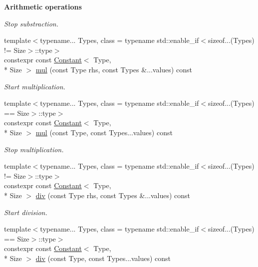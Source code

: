 \begin{Indent}{\bf Arithmetic operations}
\begin{DoxyCompactItemize}
\begin{DoxyCompactList}\small\item\em Stop substraction. \end{DoxyCompactList}\item 
{\footnotesize template$<$typename... Types, class  = typename std\-::enable\-\_\-if$<$sizeof...(\-Types) != Size$>$\-::type$>$ }\\constexpr const \hyperlink{exceptionmagrathea_1_1Constant}{Constant}$<$ Type, \\*
Size $>$ \hyperlink{exceptionmagrathea_1_1Constant_a3a426a14fc3ebb44c36eca6895eadfd5}{mul} (const Type rhs, const Types \&...values) const 
\begin{DoxyCompactList}\small\item\em Start multiplication. \end{DoxyCompactList}\item 
{\footnotesize template$<$typename... Types, class  = typename std\-::enable\-\_\-if$<$sizeof...(\-Types) == Size$>$\-::type$>$ }\\constexpr const \hyperlink{exceptionmagrathea_1_1Constant}{Constant}$<$ Type, \\*
Size $>$ \hyperlink{exceptionmagrathea_1_1Constant_a31a02497bdf0805776395f1be257e0ce}{mul} (const Type, const Types...\-values) const 
\begin{DoxyCompactList}\small\item\em Stop multiplication. \end{DoxyCompactList}\item 
{\footnotesize template$<$typename... Types, class  = typename std\-::enable\-\_\-if$<$sizeof...(\-Types) != Size$>$\-::type$>$ }\\constexpr const \hyperlink{exceptionmagrathea_1_1Constant}{Constant}$<$ Type, \\*
Size $>$ \hyperlink{exceptionmagrathea_1_1Constant_ae1ec772ee7ac6d16656b9e4f88456e0b}{div} (const Type rhs, const Types \&...values) const 
\begin{DoxyCompactList}\small\item\em Start division. \end{DoxyCompactList}\item 
{\footnotesize template$<$typename... Types, class  = typename std\-::enable\-\_\-if$<$sizeof...(\-Types) == Size$>$\-::type$>$ }\\constexpr const \hyperlink{exceptionmagrathea_1_1Constant}{Constant}$<$ Type, \\*
Size $>$ \hyperlink{exceptionmagrathea_1_1Constant_a6ff3d65343a6be2d0f51762acca8f34d}{div} (const Type, const Types...\-values) const 

\end{DoxyCompactItemize}
\end{Indent}
